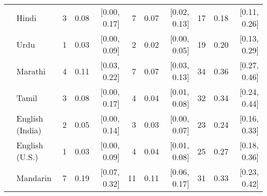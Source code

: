 \begin{table}[H]
\begin{footnotesize}
\begin{tabular}{p{.1in}lrrrrrrrrr}
 & Hindi & 3 & 0.08 & [0.00, 0.17] & 7 & 0.07 & [0.02, 0.13] & 17 & 0.18 & [0.11, 0.26]\\

 & Urdu & 1 & 0.03 & [0.00, 0.09] & 2 & 0.02 & [0.00, 0.05] & 19 & 0.20 & [0.13, 0.29]\\

 & Marathi & 4 & 0.11 & [0.03, 0.22] & 7 & 0.07 & [0.03, 0.13] & 34 & 0.36 & [0.27, 0.46]\\

 & Tamil & 3 & 0.08 & [0.00, 0.17] & 4 & 0.04 & [0.01, 0.08] & 32 & 0.34 & [0.24, 0.44]\\

 & English (India) & 2 & 0.05 & [0.00, 0.14] & 3 & 0.03 & [0.00, 0.07] & 23 & 0.24 & [0.16, 0.33]\\

 & English (U.S.) & 1 & 0.03 & [0.00, 0.09] & 4 & 0.04 & [0.01, 0.08] & 25 & 0.27 & [0.18, 0.36]\\

& Mandarin & 7 & 0.19 & [0.07, 0.32] & 11 & 0.11 & [0.06, 0.17] & 31 & 0.33 & [0.23, 0.42]\\
\bottomrule
\end{tabular}
\end{footnotesize}
\end{table}